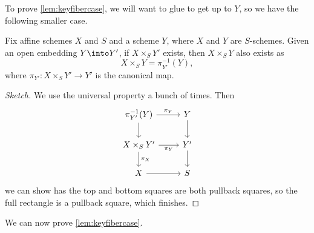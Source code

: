 \documentclass[../notes.tex]{subfiles}
\begin{document}
To prove \autoref{lem:keyfibercase}, we will want to glue to get up to $Y$, so we have the following smaller case.
\begin{lemma} \label{lem:helpkeycase}
	Fix affine schemes $X$ and $S$ and a scheme $Y$, where $X$ and $Y$ are $S$-schemes. Given an open embedding $Y\into Y'$, if $X\times_SY'$ exists, then $X\times_SY$ also exists as
	\[X\times_SY=\pi^{-1}_{Y'}(Y),\]
	where $\pi_{Y'}\colon X\times_SY'\to Y'$ is the canonical map.
\end{lemma}
\begin{proof}[Sketch]
	We use the universal property a bunch of times. Then
	\[\begin{tikzcd}
		{\pi^{-1}_{Y'}(Y)} & Y \\
		{X\times_SY'} & {Y'} \\
		X & S
		\arrow[from=3-1, to=3-2]
		\arrow[from=2-2, to=3-2]
		\arrow["{\pi_X}", from=2-1, to=3-1]
		\arrow["{\pi_Y}"', from=2-1, to=2-2]
		\arrow["{\pi_Y}", from=1-1, to=1-2]
		\arrow[from=1-1, to=2-1]
		\arrow[from=1-2, to=2-2]
	\end{tikzcd}\]
	we can show has the top and bottom squares are both pullback squares, so the full rectangle is a pullback square, which finishes.
\end{proof}
We can now prove \autoref{lem:keyfibercase}.
\end{document}
